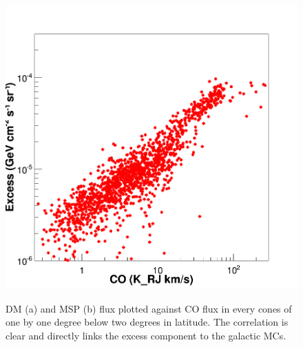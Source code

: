 \begin{figure}[H]
\begin{minipage}[h]{0.7\linewidth}
	\includegraphics[width=1\linewidth]{pic/results/COvsMSP_2_Spectra.png}
  	\subcaption{}
  	\label{fig:MSP_CO_correlation}
  \end{minipage}
  \caption[Correlation of DM and MSP to CO emission.]{DM (a) and MSP (b) flux plotted against CO flux in every cones of one by one degree below two degrees in latitude. The correlation is clear and directly links the excess component to the galactic MCs.}
  \label{app:DM_MSP_CO_correlation}	 
\end{figure}



\newpage
